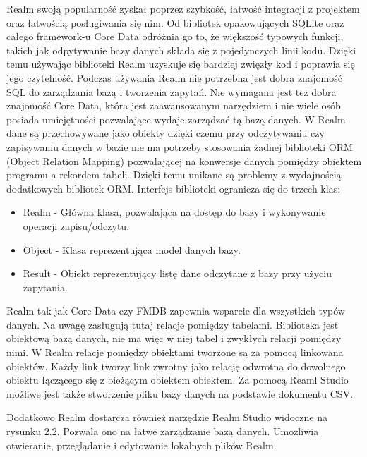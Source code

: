 Realm swoją popularność zyskał poprzez szybkość, łatwość integracji z projektem oraz łatwością posługiwania się nim. Od bibliotek opakowujących SQLite oraz całego framework-u Core Data odróżnia go to, że większość typowych funkcji, takich jak odpytywanie bazy danych składa się z pojedynczych linii kodu. Dzięki temu używając biblioteki Realm uzyskuje się bardziej zwięzły kod i poprawia się jego czytelność. Podczas używania Realm nie potrzebna jest dobra znajomość SQL do zarządzania bazą i tworzenia zapytań. Nie wymagana jest też dobra znajomość Core Data, która jest zaawansowanym narzędziem i nie wiele osób posiada umiejętności pozwalające wydaje zarządzać tą bazą danych. W Realm dane są przechowywane jako obiekty dzięki czemu przy odczytywaniu czy zapisywaniu danych w bazie nie ma potrzeby stosowania żadnej biblioteki ORM (Object Relation Mapping) pozwalającej na konwersje danych pomiędzy obiektem programu a rekordem tabeli. Dzięki temu unikane są problemy z wydajnością dodatkowych bibliotek ORM. Interfejs biblioteki ogranicza się do trzech klas: 

\begin{itemize}
	\item Realm -  Główna klasa, pozwalająca na dostęp do bazy i wykonywanie operacji zapisu/odczytu.
	\item Object - Klasa reprezentująca model danych bazy.
	\item Result - Obiekt reprezentujący listę dane odczytane z bazy przy użyciu zapytania.
\end{itemize}
 \par

Realm tak jak Core Data czy FMDB zapewnia wsparcie dla wszystkich typów danych. Na uwagę zasługują tutaj relacje pomiędzy tabelami. Biblioteka jest obiektową bazą danych, nie ma więc w niej tabel i zwykłych relacji pomiędzy nimi. W Realm relacje pomiędzy obiektami tworzone są za pomocą linkowana obiektów. Każdy link tworzy link zwrotny jako relację odwrotną do dowolnego obiektu łączącego się z bieżącym obiektem obiektem. Za pomocą Reaml Studio możliwe jest także stworzenie pliku bazy danych na podstawie dokumentu CSV.  \par 

Dodatkowo Realm dostarcza również narzędzie Realm Studio widoczne na rysunku 2.2. Pozwala ono na łatwe zarządzanie bazą danych. Umożliwia otwieranie, przeglądanie i edytowanie lokalnych plików Realm.  

